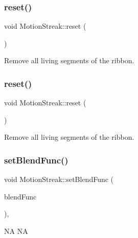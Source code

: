 \subsubsection{\texorpdfstring{reset()}{reset()}\hspace{0.1cm}{\footnotesize\ttfamily [1/2]}}
{\footnotesize\ttfamily void Motion\+Streak\+::reset (\begin{DoxyParamCaption}{ }\end{DoxyParamCaption})}

Remove all living segments of the ribbon. \mbox{\label{classMotionStreak_accbce67250d3b95ee9bf6b81c5854d44}} 
\subsubsection{\texorpdfstring{reset()}{reset()}\hspace{0.1cm}{\footnotesize\ttfamily [2/2]}}
{\footnotesize\ttfamily void Motion\+Streak\+::reset (\begin{DoxyParamCaption}{ }\end{DoxyParamCaption})}

Remove all living segments of the ribbon. \mbox{\label{classMotionStreak_adb192a5b33bd7a8f76cf04439f272808}} 
\subsubsection{\texorpdfstring{set\+Blend\+Func()}{setBlendFunc()}\hspace{0.1cm}{\footnotesize\ttfamily [1/2]}}
{\footnotesize\ttfamily void Motion\+Streak\+::set\+Blend\+Func (\begin{DoxyParamCaption}\item[{const \hyperlink{structBlendFunc}{Blend\+Func} \&}]{blend\+Func }\end{DoxyParamCaption})\hspace{0.3cm}{\ttfamily [override]}, {\ttfamily [virtual]}}

NA  NA \mbox{\label{classMotionStreak_adccc64d7aba6a8ffc6ce34a0813630af}} 
